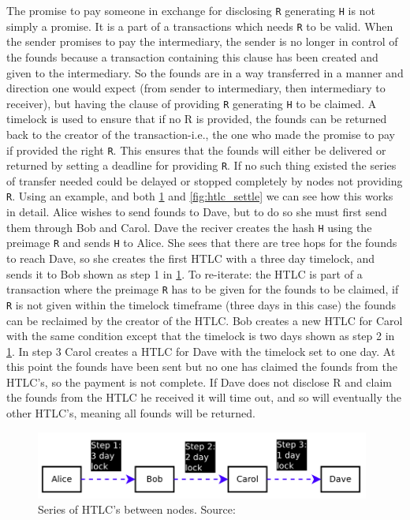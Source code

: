 The promise to pay someone in exchange for disclosing {\tt R} generating {\tt H} is not simply a promise. It is a part of a transactions which needs {\tt R} to be valid. When the sender promises to pay the intermediary, the sender is no longer in control of the founds because a transaction containing this clause has been created and given to the intermediary. So the founds are in a way transferred in a manner and direction one would expect (from sender to intermediary, then intermediary to receiver), but having the clause of providing {\tt R} generating {\tt H} to be claimed. A timelock is used to ensure that if no R is provided, the founds can be returned back to the creator of the transaction-i.e., the one who made the promise to pay if provided the right {\tt R}. This ensures that the founds will either be delivered or returned by setting a deadline for providing {\tt R}. If no such thing existed the series of transfer needed could be delayed or stopped completely by nodes not providing {\tt R}.
Using an example, and both \cref{fig:htlc_promise} and \cref{fig:htlc_settle} we can see how this works in detail.
Alice wishes to send founds to Dave, but to do so she must first send them through Bob and Carol. Dave the reciver creates the hash {\tt H} using the preimage {\tt R} and sends {\tt H} to Alice. She sees that there are tree hops for the founds to reach Dave, so she creates the first HTLC with a three day timelock, and sends it to Bob shown as step 1 in \cref{fig:htlc_promise}. To re-iterate: the HTLC is part of a transaction where the preimage {\tt R} has to be given for the founds to be claimed, if {\tt R} is not given within the timelock timeframe (three days in this case) the founds can be reclaimed by the creator of the HTLC. Bob creates a new HTLC for Carol with the same condition except that the timelock is two days shown as step 2 in \cref{fig:htlc_promise}. In step 3 Carol creates a HTLC for Dave with the timelock set to one day. At this point the founds have been sent but no one has claimed the founds from the HTLC's, so the payment is not complete. If Dave does not disclose R and claim the founds from the HTLC he received it will time out, and so will eventually the other HTLC's, meaning all founds will be returned.
\\

\begin{figure}[ht]
    \centering
    \includegraphics[width=11cm]{figures/htlc_promise.png}
    \caption{Series of HTLC's between nodes. Source:~\cite{poon2015bitcoin}}
    \label{fig:htlc_promise}
\end{figure}

